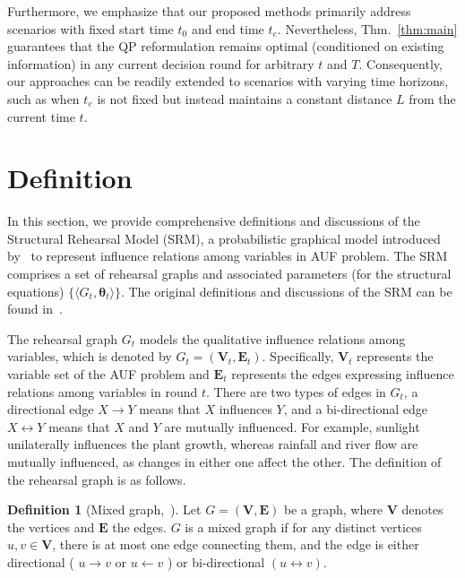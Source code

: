 \documentclass{article}
\theoremstyle{plain}
\theoremstyle{definition}
\newtheorem{definition}[theorem]{Definition}
\theoremstyle{remark}
\def \E {\mathbf{E}}
\def \V {\mathbf{V}}
\def \V {\mathbf{V}}
\begin{document}
Furthermore, we emphasize that our proposed methods primarily address scenarios with fixed start time \(t_0\) and end time \(t_e\). 
Nevertheless, Thm.~\ref{thm:main} guarantees that the QP reformulation remains optimal (conditioned on existing information) in any current decision round for arbitrary \(t\) and \(T\). 
Consequently, our approaches can be readily extended to scenarios with varying time horizons, such as when \(t_e\) is not fixed but instead maintains a constant distance \(L\) from the current time \(t\).



\section{Definition}
\label{app:definition}

In this section, we provide comprehensive definitions and discussions of the Structural Rehearsal Model (SRM), a probabilistic graphical model introduced by~\cite{qint2023srm} to represent influence relations among variables in AUF problem. 
The SRM comprises a set of rehearsal graphs and associated parameters (for the  structural equations) $\{\langle G_t, \bm{\theta}_t\rangle\}$. The original definitions and discussions of the SRM can be found in~\citet{qint2023srm}. 

The rehearsal graph $G_t$ models the qualitative influence relations among variables, which is denoted by $G_t = (\V_t, \E_t)$. 
Specifically, $\V_t$ represents the variable set of the AUF problem and $\E_t$ represents the edges expressing influence relations among variables in round \(t\). 
There are two types of edges in $G_t$, a directional edge $X\rightarrow Y$ means that $X$ influences $Y$, and a bi-directional edge $X\leftrightarrow Y$ means that $X$ and $Y$ are mutually influenced. 
For example, sunlight unilaterally influences the plant growth, whereas rainfall and river flow are mutually influenced, as changes in either one affect the other. The definition of the rehearsal graph is as follows.
\begin{definition}[Mixed graph,~\cite{qint2023srm}]
  \label{def:mixed_graph} Let $G=(\V, \E)$ be a graph, where $\V$ denotes the vertices and $\E$ the edges. $G$ is a mixed graph if for any distinct vertices $u, v \in \V$, there is at most one edge connecting them, and the edge is either directional ( $u \rightarrow v$ or $u \leftarrow v$ ) or bi-directional $(u \leftrightarrow v)$.
\end{definition}
\end{document}
